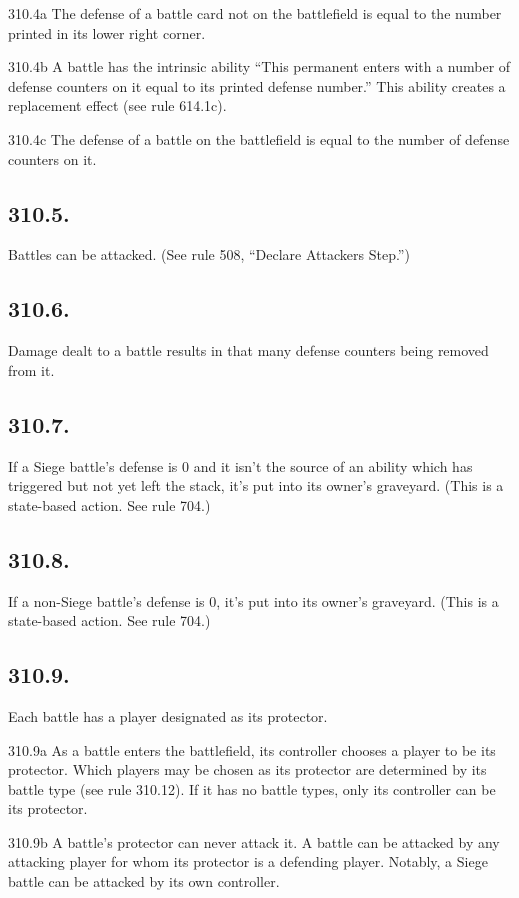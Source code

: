 310.4a The defense of a battle card not on the battlefield is equal to the number printed in its lower right corner.

310.4b A battle has the intrinsic ability “This permanent enters with a number of defense counters on it equal to its printed defense number.” This ability creates a replacement effect (see rule 614.1c).

310.4c The defense of a battle on the battlefield is equal to the number of defense counters on it.

\subsection*{310.5.}
Battles can be attacked. (See rule 508, “Declare Attackers Step.”)

\subsection*{310.6.}
Damage dealt to a battle results in that many defense counters being removed from it.

\subsection*{310.7.}
If a Siege battle’s defense is 0 and it isn’t the source of an ability which has triggered but not yet left the stack, it’s put into its owner’s graveyard. (This is a state-based action. See rule 704.)

\subsection*{310.8.}
If a non-Siege battle’s defense is 0, it’s put into its owner’s graveyard. (This is a state-based action. See rule 704.)

\subsection*{310.9.}
Each battle has a player designated as its protector.

310.9a As a battle enters the battlefield, its controller chooses a player to be its protector. Which players may be chosen as its protector are determined by its battle type (see rule 310.12). If it has no battle types, only its controller can be its protector.

310.9b A battle’s protector can never attack it. A battle can be attacked by any attacking player for whom its protector is a defending player. Notably, a Siege battle can be attacked by its own controller.

